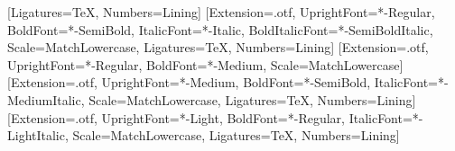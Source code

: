 
\usepackage{fontspec}
\usepackage{unicode-math}
\setmainfont{Libertinus Serif}[Ligatures=TeX, Numbers=Lining]
\setsansfont{FiraSans}[Extension=.otf, UprightFont=*-Regular, BoldFont=*-SemiBold, ItalicFont=*-Italic,
  BoldItalicFont=*-SemiBoldItalic, Scale=MatchLowercase, Ligatures=TeX, Numbers=Lining]
\setmonofont{FiraMono}[Extension=.otf, UprightFont=*-Regular, BoldFont=*-Medium, Scale=MatchLowercase]
\newfontfamily{}[Extension=.otf, UprightFont=*-Medium, BoldFont=*-SemiBold, ItalicFont=*-MediumItalic,
  Scale=MatchLowercase, Ligatures=TeX, Numbers=Lining]
\newfontfamily{}[Extension=.otf, UprightFont=*-Light, BoldFont=*-Regular, ItalicFont=*-LightItalic,
  Scale=MatchLowercase, Ligatures=TeX, Numbers=Lining]

\usepackage[a4paper, left=22mm, textwidth=128mm, marginparsep=7mm, marginparwidth=42mm,
            top=27mm, bottom=27mm, headheight=14pt, headsep=10mm, footskip=12mm]{geometry}
\usepackage{microtype}
\usepackage{setspace}
\usepackage[english]{babel}
\usepackage{csquotes}
\setlength{\parindent}{0pt}
\setlength{\parskip}{0.62\baselineskip plus 1pt minus 1pt}

\usepackage[dvipsnames,svgnames,table]{xcolor}

\usepackage{mathtools}
\usepackage{amsthm}
\usepackage{bm}
\usepackage{enumitem}
\usepackage{booktabs}
\usepackage{array}
\usepackage{multirow}
\usepackage{longtable}
\usepackage{xspace}
\usepackage{xparse}

